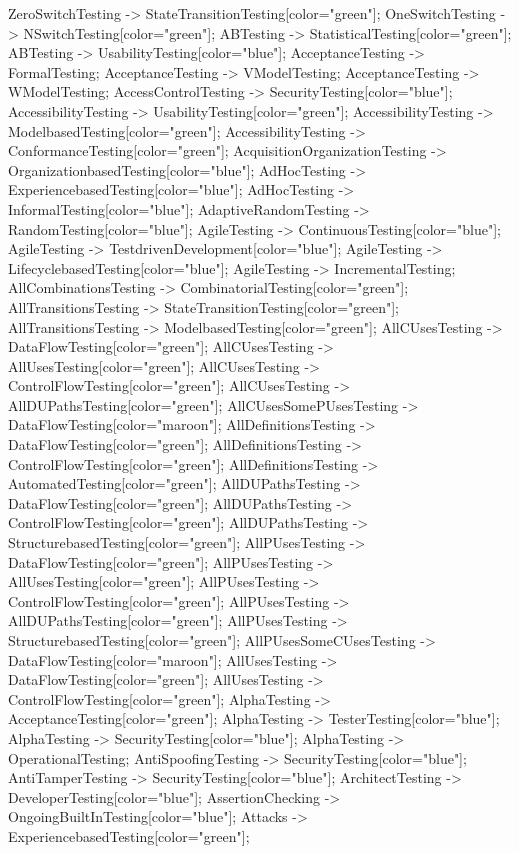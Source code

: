 \documentclass{article}
\begin{document}
{ZeroSwitchTesting -> StateTransitionTesting[color="green"];
OneSwitchTesting -> NSwitchTesting[color="green"];
ABTesting -> StatisticalTesting[color="green"];
ABTesting -> UsabilityTesting[color="blue"];
AcceptanceTesting -> FormalTesting;
AcceptanceTesting -> VModelTesting;
AcceptanceTesting -> WModelTesting;
AccessControlTesting -> SecurityTesting[color="blue"];
AccessibilityTesting -> UsabilityTesting[color="green"];
AccessibilityTesting -> ModelbasedTesting[color="green"];
AccessibilityTesting -> ConformanceTesting[color="green"];
AcquisitionOrganizationTesting -> OrganizationbasedTesting[color="blue"];
AdHocTesting -> ExperiencebasedTesting[color="blue"];
AdHocTesting -> InformalTesting[color="blue"];
AdaptiveRandomTesting -> RandomTesting[color="blue"];
AgileTesting -> ContinuousTesting[color="blue"];
AgileTesting -> TestdrivenDevelopment[color="blue"];
AgileTesting -> LifecyclebasedTesting[color="blue"];
AgileTesting -> IncrementalTesting;
AllCombinationsTesting -> CombinatorialTesting[color="green"];
AllTransitionsTesting -> StateTransitionTesting[color="green"];
AllTransitionsTesting -> ModelbasedTesting[color="green"];
AllCUsesTesting -> DataFlowTesting[color="green"];
AllCUsesTesting -> AllUsesTesting[color="green"];
AllCUsesTesting -> ControlFlowTesting[color="green"];
AllCUsesTesting -> AllDUPathsTesting[color="green"];
AllCUsesSomePUsesTesting -> DataFlowTesting[color="maroon"];
AllDefinitionsTesting -> DataFlowTesting[color="green"];
AllDefinitionsTesting -> ControlFlowTesting[color="green"];
AllDefinitionsTesting -> AutomatedTesting[color="green"];
AllDUPathsTesting -> DataFlowTesting[color="green"];
AllDUPathsTesting -> ControlFlowTesting[color="green"];
AllDUPathsTesting -> StructurebasedTesting[color="green"];
AllPUsesTesting -> DataFlowTesting[color="green"];
AllPUsesTesting -> AllUsesTesting[color="green"];
AllPUsesTesting -> ControlFlowTesting[color="green"];
AllPUsesTesting -> AllDUPathsTesting[color="green"];
AllPUsesTesting -> StructurebasedTesting[color="green"];
AllPUsesSomeCUsesTesting -> DataFlowTesting[color="maroon"];
AllUsesTesting -> DataFlowTesting[color="green"];
AllUsesTesting -> ControlFlowTesting[color="green"];
AlphaTesting -> AcceptanceTesting[color="green"];
AlphaTesting -> TesterTesting[color="blue"];
AlphaTesting -> SecurityTesting[color="blue"];
AlphaTesting -> OperationalTesting;
AntiSpoofingTesting -> SecurityTesting[color="blue"];
AntiTamperTesting -> SecurityTesting[color="blue"];
ArchitectTesting -> DeveloperTesting[color="blue"];
AssertionChecking -> OngoingBuiltInTesting[color="blue"];
Attacks -> ExperiencebasedTesting[color="green"];
}
\end{document}
